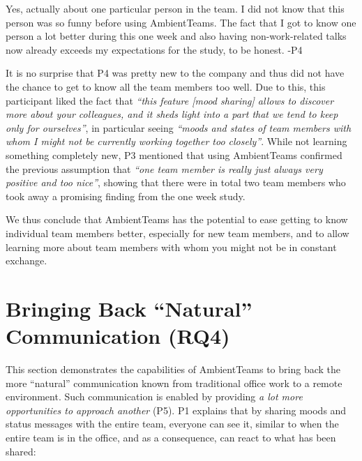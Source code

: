 \begin{displayquote}
    Yes, actually about one particular person in the team. I did not know that this person was so funny before using AmbientTeams. The fact that I got to know one person a lot better during this one week and also having non-work-related talks now already exceeds my expectations for the study, to be honest. -P4
\end{displayquote}

It is no surprise that P4 was pretty new to the company and thus did not have the chance to get to know all the team members too well. Due to this, this participant liked the fact that \textit{\enquote{this feature [mood sharing] allows to discover more about your colleagues, and it sheds light into a part that we tend to keep only for ourselves}}, in particular seeing \textit{\enquote{moods and states of team members with whom I might not be currently working together too closely}}.  While not learning something completely new, P3 mentioned that using AmbientTeams confirmed the previous assumption that \textit{\enquote{one team member is really just always very positive and too nice}}, showing that there were in total two team members who took away a promising finding from the one week study.

We thus conclude that AmbientTeams has the potential to ease getting to know individual team members better, especially for new team members, and to allow learning more about team members with whom you might not be in constant exchange.


\section{Bringing Back \enquote{Natural} Communication (RQ4)}
\label{section:bringing_back_natural_communication}
This section demonstrates the capabilities of AmbientTeams to bring back the more \enquote{natural} communication known from traditional office work to a remote environment. Such communication is enabled by providing \textit{a lot more opportunities to approach another} (P5). P1 explains that by sharing moods and status messages with the entire team, everyone can see it, similar to when the entire team is in the office, and as a consequence, can react to what has been shared:

